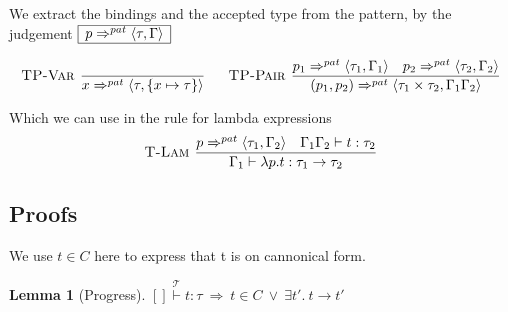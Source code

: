 \documentclass[a4paper]{article}
\newcommand{\im}{\Rightarrow}
\newcommand{\step}{\to}
\newcommand{\patbind}{\Rightarrow^{pat}}
\newcommand{\angled}[1]{\langle #1\rangle}
\newcommand{\T}{\mathcal{T}}
\newcommand{\stackover}[2]{\stackrel{{#2}}{#1}}
\renewcommand{\rule}[3][]{\ \mbox{\textsc{#1 }}\dfrac{#2}{#3}\ }
\newcommand{\smbox}[1]{
  $\begin{array}{|c|}
    \hline
    #1 \\
    \hline
  \end{array}$
}
\newtheorem{lemma}{Lemma}[section]
\begin{document}
We extract the bindings and the accepted type from the
pattern, by the judgement \smbox{p \patbind \angled{\tau,\Gamma}}
\[
\rule[TP-Var]{}{x \patbind \angled{\tau,\{x \mapsto \tau\}}}\quad
\rule[TP-Pair]{p_1 \patbind \angled{\tau_1,\Gamma_1}\quad p_2 \patbind \angled{\tau_2,\Gamma_2}}
{(p_1, p_2) \patbind \angled{\tau_1\times\tau_2,\Gamma_1\Gamma_2}}
\]

Which we can use in the rule for lambda expressions
\[
\rule[T-Lam]{p \patbind \angled{\tau_1,\Gamma_2} \quad \Gamma_1\Gamma_2\vdash t : \tau_2}
{\Gamma_1 \vdash \lambda p.t : \tau_1 \step \tau_2}
\]


\subsection{Proofs}

We use $t \in C$ here to express that t is on cannonical form.

\begin{lemma}[Progress]
\label{lemma:progress}
$\stackover{[]\vdash t:\tau}{\T}\ \im\ t \in C\  \lor\  \exists t'.\ t\step t'$
\end{lemma}
\end{document}
